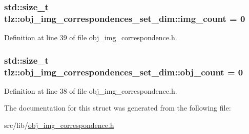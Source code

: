 \subsubsection[{\texorpdfstring{img\+\_\+count}{img_count}}]{\setlength{\rightskip}{0pt plus 5cm}std\+::size\+\_\+t tlz\+::obj\+\_\+img\+\_\+correspondences\+\_\+set\+\_\+dim\+::img\+\_\+count = 0}\hypertarget{structtlz_1_1obj__img__correspondences__set__dim_a5e8384f9da8f1f249b71314924b19920}{}\label{structtlz_1_1obj__img__correspondences__set__dim_a5e8384f9da8f1f249b71314924b19920}


Definition at line 39 of file obj\+\_\+img\+\_\+correspondence.\+h.

\subsubsection[{\texorpdfstring{obj\+\_\+count}{obj_count}}]{\setlength{\rightskip}{0pt plus 5cm}std\+::size\+\_\+t tlz\+::obj\+\_\+img\+\_\+correspondences\+\_\+set\+\_\+dim\+::obj\+\_\+count = 0}\hypertarget{structtlz_1_1obj__img__correspondences__set__dim_a0e47d36ada0e0e1549aab4fc6664fff1}{}\label{structtlz_1_1obj__img__correspondences__set__dim_a0e47d36ada0e0e1549aab4fc6664fff1}


Definition at line 38 of file obj\+\_\+img\+\_\+correspondence.\+h.



The documentation for this struct was generated from the following file\+:\begin{DoxyCompactItemize}
\item 
src/lib/\hyperlink{obj__img__correspondence_8h}{obj\+\_\+img\+\_\+correspondence.\+h}\end{DoxyCompactItemize}

